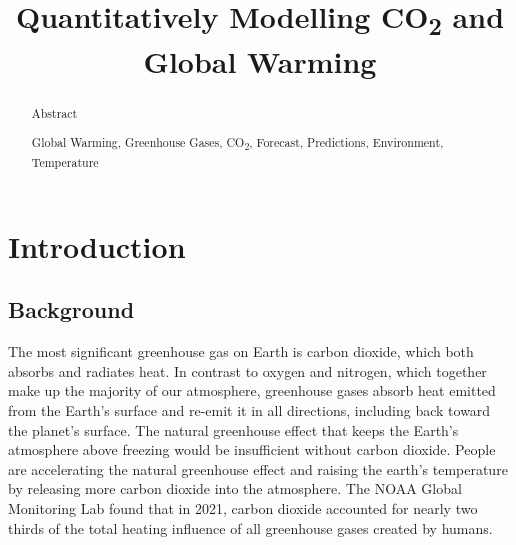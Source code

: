 \documentclass{mcmthesis}
\begin{document}
    \graphicspath{ {./figs/} }

    \setlength{\abovedisplayskip}{3pt}
    \setlength{\belowdisplayskip}{3pt}
    \setlength{\abovedisplayshortskip}{-12pt}
    \setlength{\belowdisplayshortskip}{0pt}

    \setlength{\abovecaptionskip}{0pt}

    \title{Quantitatively Modelling CO\textsubscript{2} and Global Warming}


    \begin{abstract}
        Abstract

        \begin{keywords}
            Global Warming, Greenhouse Gases, CO\textsubscript{2}, Forecast, Predictions, Environment, Temperature
        \end{keywords}

    \end{abstract}

    \maketitle
    \tableofcontents
    \newpage


    


    \section{Introduction}

    \subsection{Background}
    The most significant greenhouse gas on Earth is carbon dioxide, which both absorbs and radiates heat. In contrast to oxygen and nitrogen, which together make up the majority of our atmosphere, greenhouse gases absorb heat emitted from the Earth's surface and re-emit it in all directions, including back toward the planet's surface. The natural greenhouse effect that keeps the Earth's atmosphere above freezing would be insufficient without carbon dioxide. People are accelerating the natural greenhouse effect and raising the earth's temperature by releasing more carbon dioxide into the atmosphere. The NOAA Global Monitoring Lab found that in 2021, carbon dioxide accounted for nearly two thirds of the total heating influence of all greenhouse gases created by humans.
\end{document}
